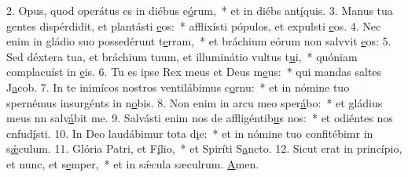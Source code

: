 2. Opus, quod operátus es in diébus e\uline{ó}rum,~* et in diébs ant\uline{í}quis.
3. Manus tua gentes dispérdidit, et plantásti \uline{e}os:~* afflixísti pópulos, et expulsti \uline{e}os.
4. Nec enim in gládio suo possedérunt t\uline{e}rram,~* et bráchium eórum non salvvit \uline{e}os:
5. Sed déxtera tua, et bráchium tuum, et illuminátio vultus t\uline{u}i,~* quóniam complacuíst in \uline{e}is.
6. Tu es ipse Rex meus et Deus m\uline{e}us:~* qui mandas saltes J\uline{a}cob.
7. In te inimícos nostros ventilábimus c\uline{o}rnu:~* et in nómine tuo spernémus insurgénts in n\uline{o}bis.
8. Non enim in arcu meo sper\uline{á}bo:~* et gládius meus nn salv\uline{á}bit me.
9. Salvásti enim nos de affligéntib\uline{u}s nos:~* et odiéntes nos cnfud\uline{í}sti.
10. In Deo laudábimur tota d\uline{i}e:~* et in nómine tuo confitébimr in s\uline{ǽ}culum.
11. Glória Patri, et F\uline{í}lio,~* et Spiríti S\uline{a}ncto.
12. Sicut erat in princípio, et nunc, et s\uline{e}mper,~* et in sǽcula sæculrum. \uline{A}men.
